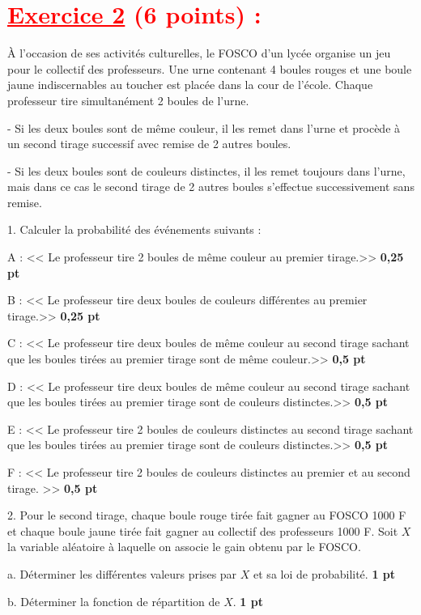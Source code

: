 \documentclass[12pt]{article}
\begin{document}
\section*{\textcolor{red}{\underline{Exercice 2} (6 points) :}}
À l’occasion de ses activités culturelles, le FOSCO d’un lycée organise un jeu pour le collectif des professeurs. Une urne contenant 4 boules rouges et une boule jaune indiscernables au toucher est placée dans la cour de l’école. Chaque professeur tire simultanément 2 boules de l’urne.

- Si les deux boules sont de même couleur, il les remet dans l’urne et procède à un second tirage successif avec remise de 2 autres boules.

- Si les deux boules sont de couleurs distinctes, il les remet toujours dans l’urne, mais dans ce cas le second tirage de 2 autres boules s’effectue successivement sans remise.

1. Calculer la probabilité des événements suivants :

A : << Le professeur tire 2 boules de même couleur au premier tirage.>> \textbf{0,25 pt}

B : << Le professeur tire deux boules de couleurs différentes au premier tirage.>>  \textbf{0,25 pt}

C : << Le professeur tire deux boules de même couleur au second tirage sachant que les boules tirées au premier tirage sont de même couleur.>>  \textbf{0,5 pt}

D : << Le professeur tire deux boules de même couleur au second tirage sachant que les boules tirées au premier tirage sont de couleurs distinctes.>> \textbf{0,5 pt}

E : << Le professeur tire 2 boules de couleurs distinctes au second tirage sachant que les boules tirées au premier tirage sont de couleurs distinctes.>> \textbf{0,5 pt}

F : << Le professeur tire 2 boules de couleurs distinctes au premier et au second tirage. >> \textbf{0,5 pt}

2. Pour le second tirage, chaque boule rouge tirée fait gagner au FOSCO 1000 F et chaque boule jaune tirée fait gagner au collectif des professeurs 1000 F.
Soit \(X\) la variable aléatoire à laquelle on associe le gain obtenu par le FOSCO.

a. Déterminer les différentes valeurs prises par \(X\) et sa loi de probabilité. \textbf{1 pt}

b. Déterminer la fonction de répartition de \(X\). \textbf{1 pt}
\end{document}
